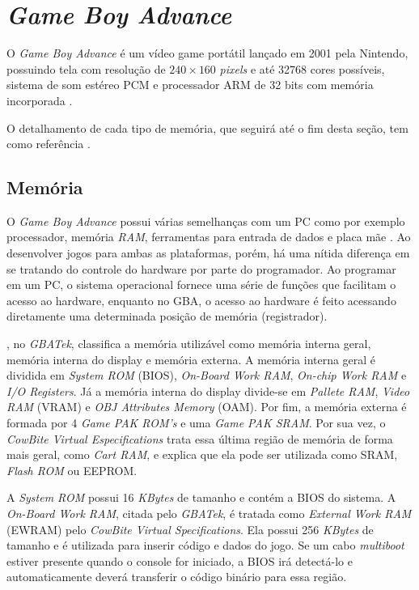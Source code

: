 \section{\textit{Game Boy Advance}} \label{gba}

  O \textit{Game Boy Advance} é um vídeo game portátil lançado em 2001 pela Nintendo, possuindo tela com resolução de $240\times160$ \textit{pixels} e até 32768 cores possíveis, sistema de som estéreo PCM e processador ARM de 32 bits com memória incorporada \cite{nintendo}.

  O detalhamento de cada tipo de memória, que seguirá até o fim desta seção, tem como referência \cite{cowbite}.

  \subsection{Memória} \label{gba-memory}

    O \textit{Game Boy Advance} possui várias semelhanças com um PC como por exemplo processador, memória \textit{RAM}, ferramentas para entrada de dados e placa mãe \cite{harbour}. Ao desenvolver jogos para ambas as plataformas, porém, há uma nítida diferença em se tratando do controle do hardware por parte do programador. Ao programar em um PC, o sistema operacional fornece uma série de funções que facilitam o acesso ao hardware, enquanto no GBA, o acesso ao hardware é feito acessando diretamente uma determinada posição de memória (registrador).

    , no \textit{GBATek}, classifica a memória utilizável como memória interna geral, memória interna do display e memória externa. A memória interna geral é dividida em \textit{System ROM} (BIOS), \textit{On-Board Work RAM}, \textit{On-chip Work RAM} e \textit{I/O Registers}. Já a memória interna do display divide-se em \textit{Pallete RAM}, \textit{Video RAM} (VRAM) e \textit{OBJ Attributes Memory} (OAM). Por fim, a memória externa é formada por 4 \textit{Game PAK ROM's} e uma \textit{Game PAK SRAM}. Por sua vez, o \textit{CowBite Virtual Especifications} trata essa última região de memória de forma mais geral, como \textit{Cart RAM}, e explica que ela pode ser utilizada como SRAM, \textit{Flash ROM} ou EEPROM.

    A \textit{System ROM} possui 16 \textit{KBytes} de tamanho e contém a BIOS do sistema. A \textit{On-Board Work RAM}, citada pelo \textit{GBATek}, é tratada como \textit{External Work RAM} (EWRAM) pelo \textit{CowBite Virtual Specifications}. Ela possui 256 \textit{KBytes} de tamanho e é utilizada para inserir código e dados do jogo. Se um cabo \textit{multiboot} estiver presente quando o console for iniciado, a BIOS irá detectá-lo e automaticamente deverá transferir o código binário para essa região.

